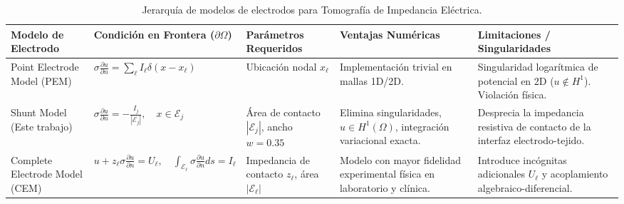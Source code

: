 \begin{table}[htbp]
  \centering
  \caption{Jerarquía de modelos de electrodos para Tomografía de Impedancia Eléctrica.}
  \label{tab:electrode_models}
  \begin{tabular}{p{3.0cm} p{4.2cm} p{2.8cm} p{3.2cm} p{3.2cm}}
    \hline\hline
    \textbf{Modelo de Electrodo} & \textbf{Condición en Frontera ($\partial\Omega$)} & \textbf{Parámetros Requeridos} & \textbf{Ventajas Numéricas} & \textbf{Limitaciones / Singularidades} \\ \hline
    Point Electrode Model (PEM) & $\sigma \frac{\partial u}{\partial n} = \sum_{\ell} I_\ell \delta(x - x_\ell)$ & Ubicación nodal $x_\ell$ & Implementación trivial en mallas 1D/2D. & Singularidad logarítmica de potencial en 2D ($u \notin H^1$). Violación física. \\ \hline
    Shunt Model (Este trabajo) & $\sigma \frac{\partial u}{\partial n} = -\frac{I_j}{|\mathcal{E}_j|}, \quad x \in \mathcal{E}_j$ & Área de contacto $|\mathcal{E}_j|$, ancho $w=0.35$ & Elimina singularidades, $u \in H^1(\Omega)$, integración variacional exacta. & Desprecia la impedancia resistiva de contacto de la interfaz electrodo-tejido. \\ \hline
    Complete Electrode Model (CEM) & $u + z_\ell \sigma \frac{\partial u}{\partial n} = U_\ell, \quad \int_{\mathcal{E}_\ell} \sigma \frac{\partial u}{\partial n} ds = I_\ell$ & Impedancia de contacto $z_\ell$, área $|\mathcal{E}_\ell|$ & Modelo con mayor fidelidad experimental física en laboratorio y clínica. & Introduce incógnitas adicionales $U_\ell$ y acoplamiento algebraico-diferencial. \\ \hline
    \hline\hline
  \end{tabular}
\end{table}

